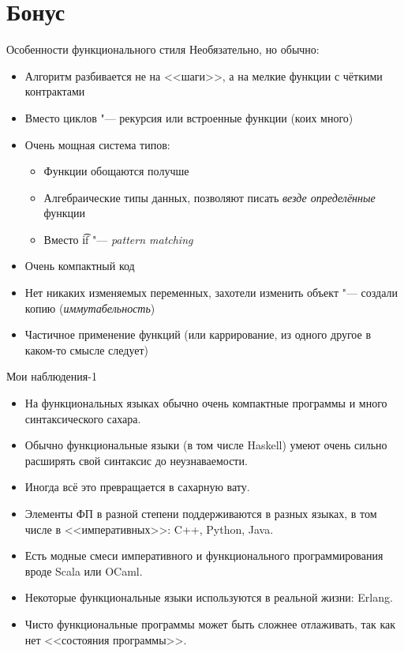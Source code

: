 \section{Бонус}

\begin{frame}
\end{frame}

\begin{frame}{Особенности функционального стиля}
	Необязательно, но обычно:
	\begin{itemize}
		\item Алгоритм разбивается не на <<шаги>>, а на мелкие функции с чёткими контрактами
		\item Вместо циклов "--- рекурсия или встроенные функции (коих много)
		\item Очень мощная система типов:
			\begin{itemize}
				\item Функции обощаются получше
				\item Алгебраические типы данных, позволяют писать \textit{везде определённые} функции
				\item Вместо \t{if} "--- \textit{pattern matching}
			\end{itemize}
		\item Очень компактный код
		\item Нет никаких изменяемых переменных, захотели изменить объект "--- создали копию (\textit{иммутабельность})
		\item Частичное применение функций (или каррирование, из одного другое в каком-то смысле следует)
	\end{itemize}
\end{frame}

\begin{frame}{Мои наблюдения-1}
	\begin{itemize}
		\item На функциональных языках обычно очень компактные программы и много синтаксического сахара.
		\item Обычно функциональные языки (в том числе Haskell) умеют очень сильно расширять свой синтаксис до неузнаваемости.
		\item Иногда всё это превращается в сахарную вату.
		\item Элементы ФП в разной степени поддерживаются в разных языках, в том числе в
			<<императивных>>: C++, Python, Java.
		\item Есть модные смеси императивного и функционального программирования вроде Scala или OCaml.
		\item Некоторые функциональные языки используются в реальной жизни: Erlang.
		\item Чисто функциональные программы может быть сложнее отлаживать, так как нет <<состояния программы>>.
	\end{itemize}
\end{frame}


